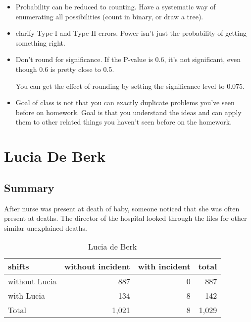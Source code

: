 \documentclass[letterpaper, landscape]{exam}
\begin{document}
\begin{itemize}
    \item Probability can be reduced to counting. Have a systematic way of
      enumerating all possibilities (count in binary, or draw a tree).

    \item clarify Type-I and Type-II errors. Power isn't just the probability of
      getting something right.

    \item Don't round for significance. If the P-value is 0.6, it's not
      significant, even though 0.6 is pretty close to 0.5. 
      
      You can get the effect of rounding by setting the significance level to
      0.075.

    \item Goal of class is not that you can exactly duplicate problems you've
      seen before on homework. Goal is that you understand the ideas and can
      apply them to other related things you haven't seen before on the
      homework.

  \end{itemize}

  \section{Lucia De Berk}

  \subsection{Summary} %
  
  After nurse was present at death of baby, someone noticed that she was often
  present at deaths. The director of the hospital looked through the files for
  other similar unexplained deaths. 

  \begin{table}[H]
    \centering
    \begin{tabular}{lrrr}
      \toprule
      shifts        & without incident & with incident & total \\
      \midrule
      without Lucia & 887              & 0             & 887 \\
      with Lucia    & 134              & 8             & 142 \\
      Total         & 1,021            & 8             & 1,029 \\
      \bottomrule
    \end{tabular}
    \caption{Lucia de Berk}\label{tab:ldb1}
  \end{table}
\end{document}
